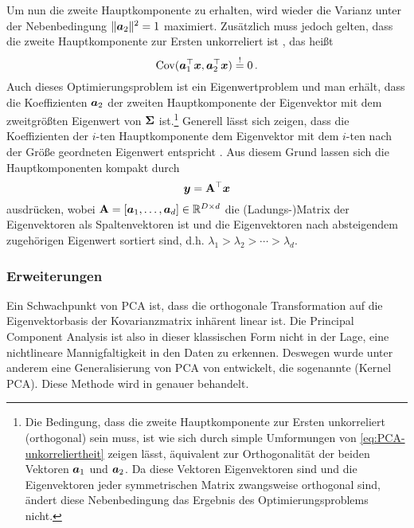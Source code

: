 Um nun die zweite Hauptkomponente zu erhalten, wird wieder die Varianz unter der Nebenbedingung
$\lVert\bm{a}_2\rVert^2 = 1$ maximiert. Zusätzlich muss jedoch gelten, dass die zweite Hauptkomponente
zur Ersten unkorreliert ist \parencite[5]{Jolliffe.2002}, das heißt
\begin{equation}
	\label{eq:PCA-unkorreliertheit}
	\operatorname{Cov}(\bm{a}_1^\top\bm{x}, \bm{a}_2^\top\bm{x}) \overset{!}{=} 0 \, .
\end{equation}
Auch dieses Optimierungsproblem ist ein Eigenwertproblem und man erhält, dass die Koeffizienten $\bm{a}_2$ der zweiten Hauptkomponente der Eigenvektor mit dem zweitgrößten Eigenwert von $\mathbf{\Sigma}$ ist.\footnote{Die Bedingung, dass die zweite Hauptkomponente zur Ersten unkorreliert (orthogonal) sein muss, ist wie sich durch simple Umformungen von \eqref{eq:PCA-unkorreliertheit} zeigen lässt, äquivalent zur Orthogonalität der beiden Vektoren $\bm{a}_1$ und $\bm{a}_2$. Da diese Vektoren Eigenvektoren sind und die Eigenvektoren jeder symmetrischen Matrix zwangsweise orthogonal sind, ändert diese Nebenbedingung das Ergebnis des Optimierungsproblems nicht.}
Generell lässt sich zeigen, dass die Koeffizienten der $i$-ten Hauptkomponente dem Eigenvektor mit dem $i$-ten nach der Größe geordneten Eigenwert entspricht \parencite[6]{Jolliffe.2002}. Aus diesem Grund lassen sich die Hauptkomponenten kompakt durch
\begin{equation}
	\bm{y} = \mathbf{A}^\top \bm{x}
\end{equation}
ausdrücken, wobei $\mathbf{A} = [\bm{a}_1,\ldots,\bm{a}_d] \in \mathbb{R}^{D \times d}$ die (Ladungs-)Matrix der Eigenvektoren als Spaltenvektoren ist und die Eigenvektoren nach absteigendem zugehörigen Eigenwert sortiert sind, d.h. $\lambda_1 > \lambda_2 > \cdots > \lambda_d$.

\subsubsection{Erweiterungen}
\label{ch:MethodenDerDimRed:statistisch:PCA:Erweiterungen}

Ein Schwachpunkt von PCA ist, dass die orthogonale Transformation auf die Eigenvektorbasis der
Kovarianzmatrix inhärent linear ist. Die Principal Component Analysis ist also in dieser
klassischen Form nicht in der Lage, eine nichtlineare Mannigfaltigkeit in den Daten zu erkennen.
Deswegen wurde unter anderem eine Generalisierung von PCA von \textcite{Scholkopf.1997} entwickelt,
die sogenannte  (Kernel PCA). Diese Methode wird in
 genauer behandelt.

